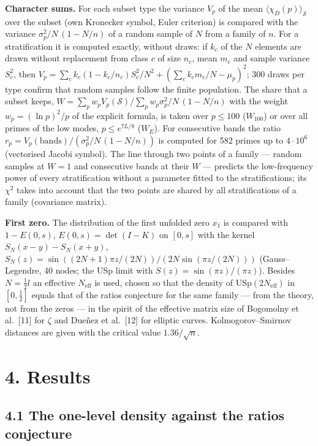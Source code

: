 \documentclass[
  10pt,
]{article}
\begin{document}
\textbf{Character sums.} For each subset type the variance \(V_p\) of
the mean \(\langle\chi_D(p)\rangle_{\mathcal S}\) over the subset (own
Kronecker symbol, Euler criterion) is compared with the variance
\(\sigma_p^2/N\,(1 - N/n)\) of a random sample of \(N\) from a family of
\(n\). For a stratification it is computed exactly, without draws: if
\(k_c\) of the \(N\) elements are drawn without replacement from class
\(c\) of size \(n_c\), mean \(m_c\) and sample variance \(S_c^2\), then
\(V_p = \sum_c k_c(1 - k_c/n_c)S_c^2/N^2 + (\sum_c k_c m_c/N - \mu_p)^2\);
300 draws per type confirm that random samples follow the finite
population. The share that a subset keeps,
\(W = \sum_p w_p V_p(\mathcal S)/\sum_p w_p \sigma_p^2/N\,(1 - N/n)\)
with the weight \(w_p = (\ln p)^2/p\) of the explicit formula, is taken
over \(p \le 100\) (\(W_{100}\)) or over all primes of the low modes,
\(p \le e^{7L/8}\) (\(W_E\)). For consecutive bands the ratio
\(r_p = V_p(\text{bands})/(\sigma_p^2/N\,(1 - N/n))\) is computed for
582 primes up to \(4\cdot10^6\) (vectorised Jacobi symbol). The line
through two points of a family --- random samples at \(W = 1\) and
consecutive bands at their \(W\) --- predicts the low-frequency power of
every stratification without a parameter fitted to the stratifications;
its \(\chi^2\) takes into account that the two points are shared by all
stratifications of a family (covariance matrix).

\textbf{First zero.} The distribution of the first unfolded zero \(x_1\)
is compared with \(1 - E(0, s)\), \(E(0, s) = \det(I - K)\) on
\([0, s]\) with the kernel \(S_N(x - y) - S_N(x + y)\),
\(S_N(z) = \sin((2N + 1)\pi z/(2N))/(2N\sin(\pi z/(2N)))\)
(Gauss--Legendre, 40 nodes; the USp limit with
\(S(z) = \sin(\pi z)/(\pi z)\)). Besides \(N = \frac12 l\) an effective
\(N_{\mathrm{eff}}\) is used, chosen so that the density of
USp\((2N_{\mathrm{eff}})\) in \([0, \frac12]\) equals that of the ratios
conjecture for the same family --- from the theory, not from the zeros
--- in the spirit of the effective matrix size of Bogomolny et
al.~{[}11{]} for \(\zeta\) and Dueñez et al.~{[}12{]} for elliptic
curves. Kolmogorov--Smirnov distances are given with the critical value
\(1.36/\sqrt n\).

\hypertarget{results}{%
\section{4. Results}\label{results}}

\hypertarget{the-one-level-density-against-the-ratios-conjecture}{%
\subsection{4.1 The one-level density against the ratios
conjecture}\label{the-one-level-density-against-the-ratios-conjecture}}
\end{document}

